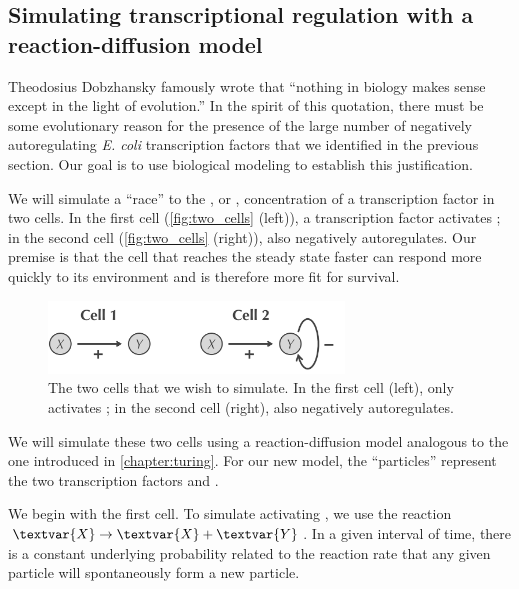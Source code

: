 \subsection{Simulating transcriptional regulation with a reaction-diffusion model}

Theodosius Dobzhansky famously wrote that ``nothing in biology makes sense except in the light of evolution.'' In the spirit of this quotation, there must be some evolutionary reason for the presence of the large number of negatively autoregulating \textit{E. coli} transcription factors that we identified in the previous section. Our goal is to use biological modeling to establish this justification.

We will simulate a ``race'' to the , or , concentration of a transcription factor  in two cells. In the first cell (\autoref{fig:two_cells} (left)), a transcription factor  activates ; in the second cell (\autoref{fig:two_cells} (right)),  also negatively autoregulates. Our premise is that the cell that reaches the steady state faster can respond more quickly to its environment and is therefore more fit for survival.

\begin{figure}[h]
\centering
\mySfFamily
\includegraphics[width = 0.7\textwidth]{../images/two_cells.png}
\caption{The two cells that we wish to simulate. In the first cell (left),  only activates ; in the second cell (right),  also negatively autoregulates.}
\label{fig:two_cells}
\end{figure}

We will simulate these two cells using a reaction-diffusion model analogous to the one introduced in \autoref{chapter:turing}. For our new model, the ``particles'' represent the two transcription factors  and .

We begin with the first cell. To simulate  activating , we use the reaction $\textvar{X} \rightarrow \textvar{X} + \textvar{Y}$. In a given interval of time, there is a constant underlying probability related to the reaction rate that any given  particle will spontaneously form a new  particle.

